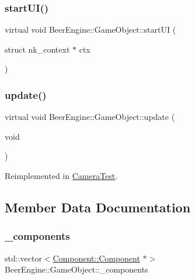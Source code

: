 \subsubsection{\texorpdfstring{start\+U\+I()}{startUI()}}
{\footnotesize\ttfamily virtual void Beer\+Engine\+::\+Game\+Object\+::start\+UI (\begin{DoxyParamCaption}\item[{struct nk\+\_\+context $\ast$}]{ctx }\end{DoxyParamCaption})\hspace{0.3cm}{\ttfamily [virtual]}}

\mbox{\label{class_beer_engine_1_1_game_object_ab53f4154cb5cecd0b1238465f7d1fc81}} 
\subsubsection{\texorpdfstring{update()}{update()}}
{\footnotesize\ttfamily virtual void Beer\+Engine\+::\+Game\+Object\+::update (\begin{DoxyParamCaption}\item[{void}]{ }\end{DoxyParamCaption})\hspace{0.3cm}{\ttfamily [virtual]}}



Reimplemented in \mbox{\hyperlink{class_camera_test_a5bacc3399e57aa311e8d5ea39c9865bf}{Camera\+Test}}.



\subsection{Member Data Documentation}
\mbox{\label{class_beer_engine_1_1_game_object_a068953c56e2d59b33077be6748a1a5c5}} 
\subsubsection{\texorpdfstring{\+\_\+components}{\_components}}
{\footnotesize\ttfamily std\+::vector$<$\mbox{\hyperlink{class_beer_engine_1_1_component_1_1_component}{Component\+::\+Component}} $\ast$$>$ Beer\+Engine\+::\+Game\+Object\+::\+\_\+components\hspace{0.3cm}{\ttfamily [protected]}}


